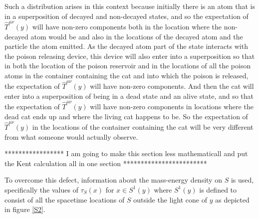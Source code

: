   Such a distribution arises in this context because initially there is an atom that is in a superposition of decayed and non-decayed states, and so the expectation of $\hat{T}^{\mu\nu}(y)$ will have non-zero components both in the location where the non-decayed atom would be and also in the locations of the decayed atom and the particle the atom emitted. As the decayed atom part of the state interacts with the poison releasing device, this device will also enter into a superposition so that in both the location of the poison reservoir and in the locations of all the poison atoms in the container containing the cat and into which the poison is released, the expectation of $\hat{T}^{\mu\nu}(y)$ will have non-zero components. And then the cat will enter into a superposition of being in a dead state and an alive state, and so that the expectation of $\hat{T}^{\mu\nu}(y)$ will have non-zero components in locations where the dead cat ends up and where the living cat happens to be. So the expectation of $\hat{T}^{\mu\nu}(y)$ in the locations of the container containing the cat will be very different from what someone would actually observe.

  ***************** I am going to make this section less mathematicall and put the Kent calculation all in one section   ************************
 
  To overcome this defect, information about the mass-energy density on $S$ is used, specifically the values of $\tau_S(x)$ for $x\in S^1(y)$ where  $S^1(y)$ is defined to consist of all the spacetime locations of $S$ outside the light cone of $y$ as depicted in figure \ref{S2}.  


